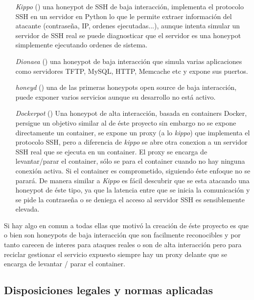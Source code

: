 \begin{enumerate}
    \item[\emph{Kippo}] (\cite{honeynet-kippo}) una honeypot de SSH de baja interacción, implementa el protocolo SSH en un servidor en Python
    lo que le permite extraer información del atacante (contraseña, IP, ordenes ejecutadas...), aunque intenta simular un servidor de SSH real
    se puede diagnosticar que el servidor es una honeypot simplemente ejecutando ordenes de sistema.
    \item[\emph{Dionaea}] (\cite{honeynet-dionaea}) una honeypot de baja interacción que simula varias aplicaciones como servidores TFTP, MySQL, HTTP, Memcache etc y expone sus puertos.
    \item[\emph{honeyd}] (\cite{honeynet-lowinteraction}) una de las primeras honeypots open source de baja interacción, puede exponer varios servicios aunque su desarrollo no está activo.
    \item[\emph{Dockerpot}] (\cite{honeynet-dockpot}) Una honeypot de alta interacción, basada en containers Docker, persigue un objetivo similar al de éste proyecto
    sin embargo no se expone directamente un container, se expone un proxy (a lo \emph{kippo}) que implementa el protocolo SSH, pero a diferencia de \emph{kippo} se abre otra conexion
    a un servidor SSH real que se ejecuta en un container. El proxy se encarga de levantar/parar el container, sólo se para el container cuando no hay ninguna conexión activa. Si el container es comprometido, siguiendo éste enfoque no se parará.
    De manera similar a \emph{Kippo} es fácil descubrir  que se esta atacando una honeypot de éste tipo, ya que la latencia entre que se inicia la comunicación
    y se pide la contraseña o se deniega el acceso al servidor SSH es sensiblemente elevada.
\end{enumerate}

Si hay algo en comun a todas ellas que motivó la creación de éste proyecto es que o bien son honeypots de baja interacción que son facilmente reconocibles
y por tanto carecen de interes para ataques reales o son de alta interacción pero para reciclar gestionar el servicio expuesto siempre hay un proxy delante
que se encarga de levantar / parar el container.

\nocite{*}
\nopagebreak
\printbibheading[title={Normas y referencias},heading=subbibnumbered]
\subsection{Disposiciones legales y normas aplicadas}
